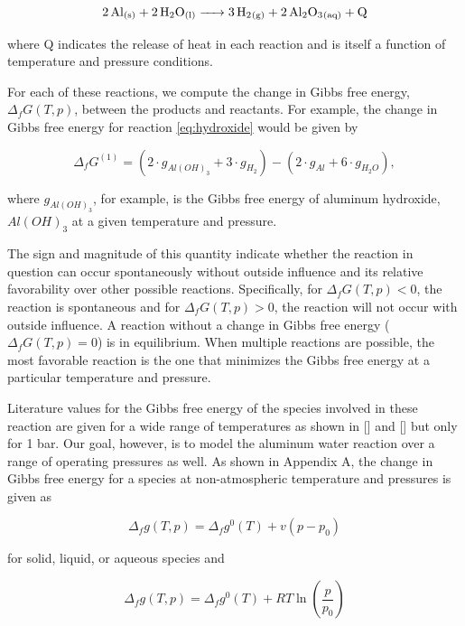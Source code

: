 \documentclass[preprint,12pt,3p]{elsarticle}
\begin{document}
\begin{equation}
  \ce{2Al_{(s)} + 2H2O_{(l)} -> 3H2_{(g)} + 2Al2O3_{(aq)} + Q}
  \label{eq:oxide}
\end{equation}

\noindent where Q indicates the release of heat in each reaction and is itself a
function of temperature and pressure conditions.

For each of these reactions, we compute the change in Gibbs free energy,
$\Delta_fG(T,p)$, between the products and reactants. For example, the change in
Gibbs free energy for reaction \ref{eq:hydroxide} would be given by

\begin{equation}
  \Delta_fG^{(1)} = (2\cdot g_{Al(OH)_3} + 3\cdot g_{H_2}) - (2\cdot g_{Al} + 6\cdot g_{H_2O}),
\end{equation}

\noindent where $g_{Al(OH)_3}$, for example, is the Gibbs free energy of
aluminum hydroxide, $Al(OH)_3$ at a given temperature and pressure.

The sign and magnitude of this quantity indicate whether the reaction in
question can occur spontaneously without outside influence and its relative
favorability over other possible reactions. Specifically, for $\Delta_fG(T,p) <
0$, the reaction is spontaneous and for $\Delta_fG(T,p) > 0$, the reaction will
not occur with outside influence. A reaction without a change in Gibbs free
energy ($\Delta_fG(T,p) = 0$) is in equilibrium. When multiple reactions are
possible, the most favorable reaction is the one that minimizes the Gibbs free
energy at a particular temperature and pressure.

Literature values for the Gibbs free energy of the species involved in these
reaction are given for a wide range of temperatures as shown in [] and [] but
only for 1 bar. Our goal, however, is to model the aluminum water reaction over
a range of operating pressures as well. As shown in Appendix A, the change in
Gibbs free energy for a species at non-atmospheric temperature and pressures is
given as

\begin{equation}
  \Delta_f g(T,p) = \Delta_f g^{0}(T) + v(p-p_0)
  \label{eq:gibbs_solid}
\end{equation}

\noindent for solid, liquid, or aqueous species and

\begin{equation}
  \Delta_f g(T,p) = \Delta_f g^{0}(T) + RT\ln\left(\frac{p}{p_0}\right) 
  \label{eq:gibbs_gas}
\end{equation}
\end{document}
